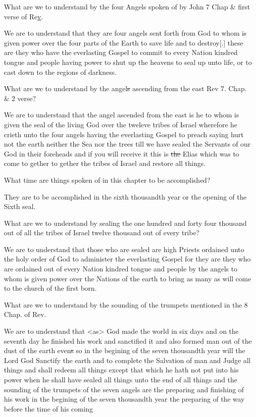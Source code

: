 \begin{compactitem}
				\item[Q] What are we to understand by the four Angels spoken of by John 7 Chap \& first verse of Re\uline{v}.
				\item[A] We are to understand that they are four angels sent forth from God to whom is given power over the four parts of the Earth to save life and to destroy[.] these are they who have the everlasting Gospel to commit to every Nation kindred tongue and people having power to shut up the heavens to seal up unto life, or to cast down to the regions of darkness.
				\item[Q] What are we to understand by the angel\sout{s} ascending from the east Rev 7. Chap. \& 2 verse?
				\item[A] We are to understand that the angel ascended from the east is he to whom is given the seal of the living God over the tweleve tribes of Israel wherefore he crieth unto the four angels having the everlasting Gospel to preach saying hurt not the earth neither the Sea nor the trees till we have sealed the Servants of our God in their foreheads and if you will receive it this is \sout{the} Elias which was to come to gether to gether the tribes of Israel and restore all things.
				\item[Q] What time are things spoken of in this chapter to be accomplished?
				\item[A] They are to be accomplished in the sixth thousandth year or the opening of the Sixth seal.
				\item[Q] What are we to understand by sealing the one hundred and forty four thousand out of all the tribes of Israel twelve thousand out of every tribe?
				\item[A] We are to understand that those who are sealed are high Priests ordained unto the holy order of God to administer the everlasting Gospel for they are they who are ordained out of every Nation kindred tongue and people by the angels to whom is given power over the Nations of the earth to bring as many as will come to the church of the first born.
				\item[Q] What are we to understand by the sounding of the trumpets mentioned in the 8 Chap. of Rev.
				\item[A] We are to understand that <as> God made the world in six days and on the seventh day he finished his work and sanctified it and also formed man out of the dust of the earth even\sout{s} so in the begining of the seven thousandth year will the Lord God Sanctify the earth and to complete the Salvation of man and Judge all things and shall redeem all things except that which he hath not put into his power when he shall have sealed all things unto the end of all things and the sounding of the trumpets of the seven angels are the preparing and finishing of his work in the begining of the seven thousandth year the preparing of the way before the time of his coming

\end{compactitem}
